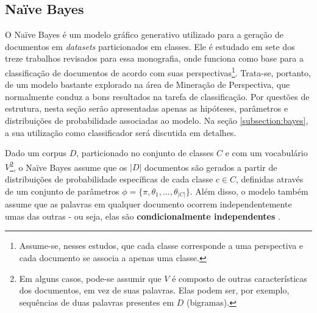 

\subsection{Naïve Bayes}
\label{subsection:naive}

O Naïve Bayes é um modelo gráfico generativo utilizado para a geração de documentos em \emph{datasets} particionados em classes. Ele é estudado em sete dos treze trabalhos revisados para essa monografia, onde funciona como base para a classificação de documentos de acordo com suas perspectivas\footnote{Assume-se, nesses estudos, que cada classe corresponde a uma perspectiva e cada documento se associa a apenas uma classe.}. Trata-se, portanto, de um modelo bastante explorado na área de Mineração de Perspectiva, que normalmente conduz a bons resultados na tarefa de classificação. Por questões de estrutura, nesta seção serão apresentadas apenas as hipóteses, parâmetros e distribuições de probabilidade associadas ao modelo. Na seção \ref{subsection:bayes}, a sua utilização como classificador será discutida em detalhes.


Dado um corpus \ensuremath{D}, particionado no conjunto de classes \ensuremath{C} e com um vocabulário \ensuremath{V}\footnote{Em alguns casos, pode-se assumir que \ensuremath{V} é composto de outras características dos documentos, em vez de suas palavras. Elas podem ser, por exemplo, sequências de duas palavras presentes em \ensuremath{D} (bigramas).}, o Naïve Bayes assume que os \ensuremath{|D|} documentos são gerados a partir de distribuições de probabilidade específicas de cada classe \ensuremath{c \in C}, definidas através de um conjunto de parâmetros \ensuremath{\phi = \{\pi, \theta_{1}, ..., \theta_{|C|}\}}. Além disso, o modelo também assume que as palavras em qualquer documento ocorrem independentemente umas das outras - ou seja, elas são \textbf{condicionalmente independentes} \cite{nigam}. %


